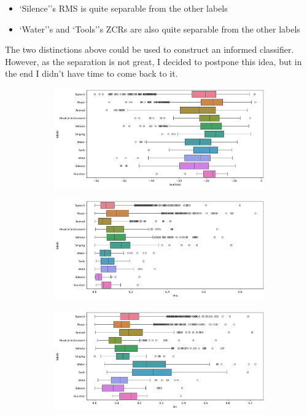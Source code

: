 \documentclass[11pt]{article}
\begin{document}
\begin{itemize}
  \item `Silence''s RMS is quite separable from the other labels
  \item `Water''s and `Tools''s ZCRs are also quite separable from the other labels
\end{itemize}

The two distinctions above could be used to construct an informed classifier.
However, as the separation is not great, I decided to postpone this idea, but
in the end I didn't have time to come back to it.

\begin{figure}
    \centering

    \begin{subfigure}{\textwidth}
      \includegraphics[height=0.3\textheight]{../notebooks/imgs/loud_dist.png}
    \end{subfigure}
    \begin{subfigure}{\textwidth}
      \includegraphics[height=0.3\textheight]{../notebooks/imgs/rms_dist.png}
    \end{subfigure}
    \begin{subfigure}{\textwidth}
      \includegraphics[height=0.3\textheight]{../notebooks/imgs/zcr_dist.png}
    \end{subfigure}


\end{figure}
\end{document}
